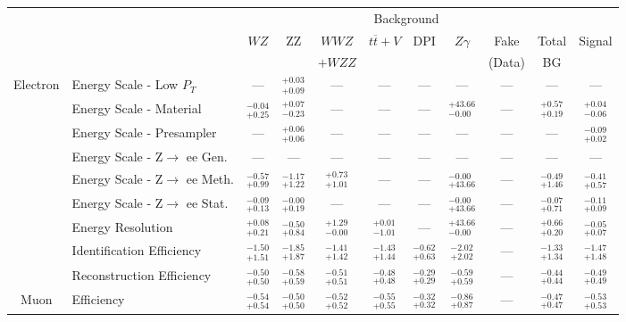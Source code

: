 \small\renewcommand{\tabcolsep}{1pt}
\begin{tabular}{|cl||ccccccc|c||c|}
\hline
 & & \multicolumn{8}{c||}{Background} & \\ 
 & & $WZ$ & ZZ & $WWZ$ & $t\overline{t}+V$ & DPI & $Z\gamma$ & Fake & Total & Signal\\ 
 & & &  & $+WZZ$ &  &  &  & (Data) & BG & \\ 
\hline\hline
\multirow{9}{*}{Electron}
&Energy Scale - Low $P_{T}$ & --- &  $^{+0.03}_{+0.09}$  & --- & --- & --- & --- & --- & --- & ---\\ 
\cline{2-11}
&Energy Scale - Material &  $^{-0.04}_{+0.25}$  &  $^{+0.07}_{-0.23}$  & --- & --- & --- &  $^{+43.66}_{-0.00}$  & --- &  $^{+0.57}_{+0.19}$  &  $^{+0.04}_{-0.06}$ \\ 
\cline{2-11}
&Energy Scale - Presampler & --- &  $^{+0.06}_{+0.06}$  & --- & --- & --- & --- & --- & --- &  $^{-0.09}_{+0.02}$ \\ 
\cline{2-11}
&Energy Scale - Z$\rightarrow$ ee Gen. & --- & --- & --- & --- & --- & --- & --- & --- & ---\\ 
\cline{2-11}
&Energy Scale - Z$\rightarrow$ ee Meth. &  $^{-0.57}_{+0.99}$  &  $^{-1.17}_{+1.22}$  &  $^{+0.73}_{+1.01}$  & --- & --- &  $^{-0.00}_{+43.66}$  & --- &  $^{-0.49}_{+1.46}$  &  $^{-0.41}_{+0.57}$ \\ 
\cline{2-11}
&Energy Scale - Z$\rightarrow$ ee Stat.&  $^{-0.09}_{+0.13}$  &  $^{-0.00}_{+0.19}$  & --- & --- & --- &  $^{-0.00}_{+43.66}$  & --- &  $^{-0.07}_{+0.71}$  &  $^{-0.11}_{+0.09}$ \\ 
\cline{2-11}
&Energy Resolution &  $^{+0.08}_{+0.21}$  &  $^{-0.50}_{+0.84}$  &  $^{+1.29}_{-0.00}$  &  $^{+0.01}_{-1.01}$  & --- &  $^{+43.66}_{-0.00}$  & --- &  $^{+0.66}_{+0.20}$  &  $^{-0.05}_{+0.07}$ \\ 
\cline{2-11}
&Identification Efficiency &  $^{-1.50}_{+1.51}$  &  $^{-1.85}_{+1.87}$  &  $^{-1.41}_{+1.42}$  &  $^{-1.43}_{+1.44}$  &  $^{-0.62}_{+0.63}$  &  $^{-2.02}_{+2.02}$  & --- &  $^{-1.33}_{+1.34}$  &  $^{-1.47}_{+1.48}$ \\ 
\cline{2-11}
&Reconstruction Efficiency &  $^{-0.50}_{+0.50}$  &  $^{-0.58}_{+0.59}$  &  $^{-0.51}_{+0.51}$  &  $^{-0.48}_{+0.48}$  &  $^{-0.29}_{+0.29}$  &  $^{-0.59}_{+0.59}$  & --- &  $^{-0.44}_{+0.44}$  &  $^{-0.49}_{+0.49}$ \\ 
\hline
\multirow{4}{*}{Muon}
&Efficiency &  $^{-0.54}_{+0.54}$  &  $^{-0.50}_{+0.50}$  &  $^{-0.52}_{+0.52}$  &  $^{-0.55}_{+0.55}$  &  $^{-0.32}_{+0.32}$  &  $^{-0.86}_{+0.87}$  & --- &  $^{-0.47}_{+0.47}$  &  $^{-0.53}_{+0.53}$ \\ 

\end{tabular}

